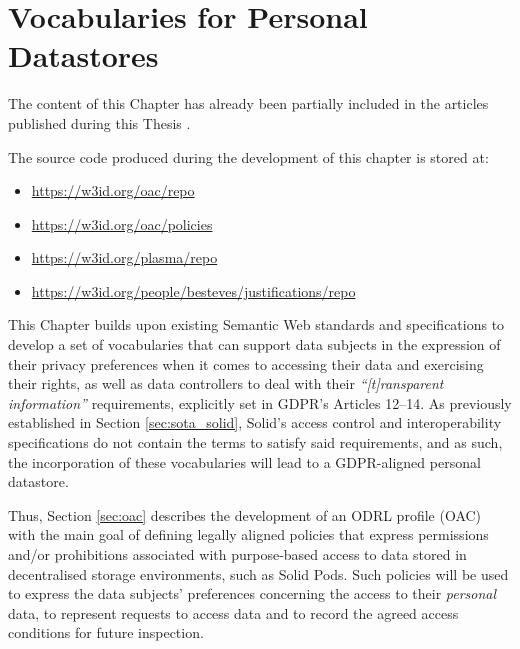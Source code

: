 \chapter{Vocabularies for Personal Datastores}
\label{chap:vocabularies}

\begin{tcolorbox}[colback=royallavender!40]
The content of this Chapter has already been partially included in the articles published during this Thesis \citep{esteves_odrl_2021,esteves_using_2023,esteves_fostering_2022}.
\end{tcolorbox}

\begin{tcolorbox}[colback=royallavender!10]
The source code produced during the development of this chapter is stored at:
\begin{itemize}
    \item \url{https://w3id.org/oac/repo}
    \item \url{https://w3id.org/oac/policies}
    \item \url{https://w3id.org/plasma/repo}
    \item \url{https://w3id.org/people/besteves/justifications/repo}
\end{itemize}
\end{tcolorbox}

This Chapter builds upon existing Semantic Web standards and specifications to develop a set of vocabularies that can support data subjects in the expression of their privacy preferences when it comes to accessing their data and exercising their rights, as well as data controllers to deal with their \textit{``[t]ransparent information''} requirements, explicitly set in GDPR's Articles 12--14.
As previously established in Section \ref{sec:sota_solid}, Solid's access control and interoperability specifications do not contain the terms to satisfy said requirements, and as such, the incorporation of these vocabularies will lead to a GDPR-aligned personal datastore.

Thus, Section \ref{sec:oac} describes the development of an ODRL profile (OAC) with the main goal of defining legally aligned policies that express permissions and/or prohibitions associated with purpose-based access to data stored in decentralised storage environments, such as Solid Pods.
Such policies will be used to express the data subjects' preferences concerning the access to their \textit{personal} data, to represent requests to access data and to record the agreed access conditions for future inspection.

